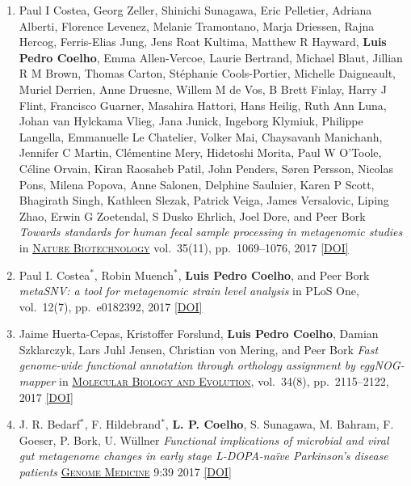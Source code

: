 \documentclass{article}
\newcommand\showdoi[1]{%
    \href{http://dx.doi.org/#1}{[DOI]}%
}
\newcommand\pubname[1]{\textsc{\uline{#1}}}
\newcommand\contribution[1]{\relax}
\newcommand\costar{${}^{*}$}
\begin{document}
\begin{enumerate}[resume]
\item Paul I Costea, Georg Zeller, Shinichi Sunagawa, Eric Pelletier, Adriana
Alberti, Florence Levenez, Melanie Tramontano, Marja Driessen, Rajna Hercog,
Ferris-Elias Jung, Jens Roat Kultima, Matthew R Hayward, \textbf{Luis Pedro
Coelho}, Emma Allen-Vercoe, Laurie Bertrand, Michael Blaut, Jillian R M Brown,
Thomas Carton, Stéphanie Cools-Portier, Michelle Daigneault, Muriel Derrien,
Anne Druesne, Willem M de Vos, B Brett Finlay, Harry J Flint, Francisco
Guarner, Masahira Hattori, Hans Heilig, Ruth Ann Luna, Johan van Hylckama
Vlieg, Jana Junick, Ingeborg Klymiuk, Philippe Langella, Emmanuelle Le
Chatelier, Volker Mai, Chaysavanh Manichanh, Jennifer C Martin, Clémentine
Mery, Hidetoshi Morita, Paul W O'Toole, Céline Orvain, Kiran Raosaheb Patil,
John Penders, Søren Persson, Nicolas Pons, Milena Popova, Anne Salonen,
Delphine Saulnier, Karen P Scott, Bhagirath Singh, Kathleen Slezak, Patrick
Veiga, James Versalovic, Liping Zhao, Erwin G Zoetendal, S Dusko Ehrlich, Joel
Dore, and Peer Bork \emph{Towards standards for human fecal sample processing
in metagenomic studies} in \pubname{Nature Biotechnology} vol.\ 35(11), pp.\
1069--1076, 2017 \showdoi{10.1038/nbt.3960}
\contribution{I contributed in the computational analysis of the samples in the
benchmark.}

\item Paul I. Costea\costar, Robin Muench\costar, \textbf{Luis Pedro Coelho},
and Peer Bork \emph{metaSNV: a tool for metagenomic strain level analysis} in
PLoS One, vol.\ 12(7), pp.\ e0182392, 2017
\showdoi{10.1371/journal.pone.0182392}
\contribution{I contributed computer code for the proposed tool, ideas for the
design of the benchmark, and participated in the manuscript preparation.}

\item Jaime Huerta-Cepas, Kristoffer Forslund, \textbf{Luis Pedro Coelho},
Damian Szklarczyk, Lars Juhl Jensen, Christian von Mering, and Peer Bork
\emph{Fast genome-wide functional annotation through orthology assignment by
eggNOG-mapper} in \pubname{Molecular Biology and Evolution}, vol.\ 34(8), pp.\
2115--2122, 2017 \showdoi{10.1093/molbev/msx148}
\contribution{I contributed to the evaluation of the tool, in particular, in
the evaluation of the suitability of the tool to metagenomics data.}

\item J. R. Bedarf\costar, F. Hildebrand\costar, \textbf{L. P. Coelho}, S.
Sunagawa, M. Bahram, F. Goeser, P. Bork, U. Wüllner \emph{Functional
implications of microbial and viral gut metagenome changes in early stage
L-DOPA-naïve Parkinson’s disease patients} \pubname{Genome Medicine} 9:39 2017
\showdoi{10.1186/s13073-017-0428-y}
\contribution{I built machine learning models based on metagenomics data.}


\end{enumerate}
\end{document}
